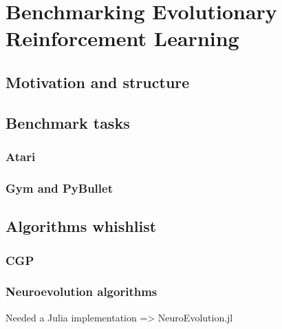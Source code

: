 \chapter{Benchmarking Evolutionary Reinforcement Learning}
\label{chap:berl}

\section{Motivation and structure}

\section{Benchmark tasks}
\subsection{Atari}

\subsection{Gym and PyBullet}

\section{Algorithms whishlist}
\subsection{CGP}
\subsection{Neuroevolution algorithms}
Needed a Julia implementation => NeuroEvolution.jl

